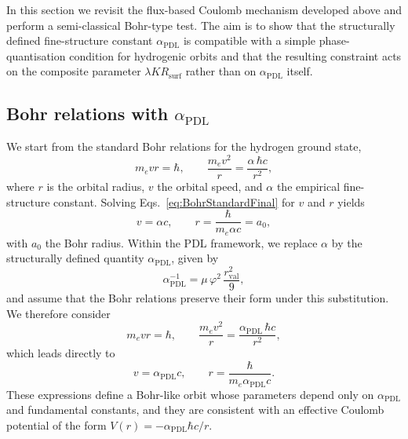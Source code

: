 \documentclass[11pt,a4paper]{article}
\begin{document}
In this section we revisit the flux-based Coulomb mechanism developed above and perform a semi-classical Bohr-type test. The aim is to show that the structurally defined fine-structure constant \(\alpha_{\mathrm{PDL}}\) is compatible with a simple phase-quantisation condition for hydrogenic orbits and that the resulting constraint acts on the composite parameter \(\lambda K R_{\mathrm{surf}}\) rather than on \(\alpha_{\mathrm{PDL}}\) itself.

\subsection{Bohr relations with \texorpdfstring{\(\alpha_{\mathrm{PDL}}\)}{alpha\_PDL}}

We start from the standard Bohr relations for the hydrogen ground state,
\begin{equation}
m_e v r = \hbar, 
\qquad 
\frac{m_e v^{2}}{r} = \frac{\alpha \,\hbar c}{r^{2}},
\label{eq:BohrStandardFinal}
\end{equation}
where \(r\) is the orbital radius, \(v\) the orbital speed, and \(\alpha\) the empirical fine-structure constant. Solving Eqs.~\eqref{eq:BohrStandardFinal} for \(v\) and \(r\) yields
\begin{equation}
v = \alpha c, 
\qquad 
r = \frac{\hbar}{m_e \alpha c} = a_0,
\end{equation}
with \(a_0\) the Bohr radius. Within the PDL framework, we replace \(\alpha\) by the structurally defined quantity \(\alpha_{\mathrm{PDL}}\), given by
\begin{equation}
\alpha_{\mathrm{PDL}}^{-1} = \mu \,\varphi^{2}\,\frac{r_{\mathrm{val}}^{2}}{9},
\end{equation}
and assume that the Bohr relations preserve their form under this substitution. We therefore consider
\begin{equation}
m_e v r = \hbar, 
\qquad 
\frac{m_e v^{2}}{r} = \frac{\alpha_{\mathrm{PDL}} \,\hbar c}{r^{2}},
\label{eq:BohrPDLFinal}
\end{equation}
which leads directly to
\begin{equation}
v = \alpha_{\mathrm{PDL}} c, 
\qquad 
r = \frac{\hbar}{m_e \alpha_{\mathrm{PDL}} c}.
\label{eq:BohrSolutionsPDLFinal}
\end{equation}
These expressions define a Bohr-like orbit whose parameters depend only on \(\alpha_{\mathrm{PDL}}\) and fundamental constants, and they are consistent with an effective Coulomb potential of the form \(V(r) = -\alpha_{\mathrm{PDL}} \hbar c / r\).
\end{document}
